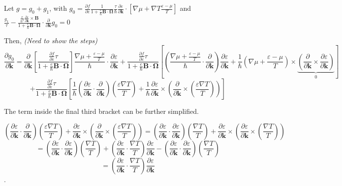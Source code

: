 \documentclass[aps,amsmath,prl]{revtex4-2}
\newcommand{\bvec}[1]{{\mathbf #1}}
\begin{document}
Let $g = g_0 + g_1$, with $g_0 = \frac{\partial f}{\partial \varepsilon}\frac{1}{1 + \frac{e}{\hbar} \bvec{B}\cdot\bvec{\Omega}}
\frac{\tau}{\hbar} \frac{\partial \varepsilon}{\partial \bvec{k}}\cdot\left[ \nabla{\mu} + \nabla T \frac{\varepsilon - \mu}{T}\right]$ and $\frac{g_1}{\tau} -\frac{\frac{e}{\hbar^2} \frac{\partial \varepsilon}{\partial \bvec{k}} \times \bvec{B}}{1 + \frac{e}{\hbar} \bvec{B}\cdot\bvec{\Omega}} \cdot\frac{\partial}{\partial \bvec{k}} g_0 = 0$

Then, \textit{(Need to show the steps)}
$$\frac{\partial g_0}{\partial \bvec{k}} = 
\frac{\partial}{\partial \bvec{k}} \left[ \frac{\frac{\partial f} {\partial \varepsilon} \tau}{1 + \frac{e}{\hbar} \bvec{B}\cdot\bvec{\Omega}}
\right] \frac{\nabla \mu + \frac{\varepsilon - \mu}{T}}{\hbar} \cdot \frac{\partial \varepsilon}{\partial \bvec{k}} + \frac{\frac{\partial f} {\partial \varepsilon} \tau}{1 + \frac{e}{\hbar} \bvec{B}\cdot\bvec{\Omega}} \left[(\frac{\nabla \mu + \frac{\varepsilon - \mu}{T}}{\hbar} \cdot \frac{\partial }{\partial \bvec{k}} )\frac{\partial \varepsilon}{\partial \bvec{k}} + \frac{1}{\hbar} (\nabla \mu + \frac{\varepsilon - \mu}{T})\times \underbrace{(\frac{\partial }{\partial \bvec{k}} \times \frac{\partial \varepsilon}{\partial \bvec{k}})}_0 \right]
$$
$$+ \frac{\frac{\partial f} {\partial \varepsilon} \tau}{1 + \frac{e}{\hbar} \bvec{B}\cdot\bvec{\Omega}} \left[\frac{1}{\hbar} (\frac{\partial \varepsilon}{\partial \bvec{k}} \cdot \frac{\partial }{\partial \bvec{k}}) (\frac{\varepsilon \nabla T}{T}) + \frac{1}{\hbar} \frac{\partial \varepsilon}{\partial \bvec{k}} \times \left(  \frac{\partial }{\partial \bvec{k}} \times \left(\frac{\varepsilon \nabla T}{T}\right) \right) \right]$$

The term inside the final third bracket can be further simplified.

$$ (\frac{\partial \varepsilon}{\partial \bvec{k}} \cdot \frac{\partial }{\partial \bvec{k}}) (\frac{\varepsilon \nabla T}{T}) + \frac{\partial \varepsilon}{\partial \bvec{k}} \times \left(  \frac{\partial }{\partial \bvec{k}} \times \left(\frac{\varepsilon \nabla T}{T}\right) \right) = (\frac{\partial \varepsilon}{\partial \bvec{k}} \cdot \frac{\partial \varepsilon}{\partial \bvec{k}}) (\frac{ \nabla T}{T}) + \frac{\partial \varepsilon}{\partial \bvec{k}} \times \left(  \frac{\partial \varepsilon}{\partial \bvec{k}} \times \left(\frac{\nabla T}{T}\right) \right)$$
$$  =(\frac{\partial \varepsilon}{\partial \bvec{k}} \cdot \frac{\partial \varepsilon}{\partial \bvec{k}}) (\frac{ \nabla T}{T}) + \left(  \frac{\partial \varepsilon}{\partial \bvec{k}} \cdot \frac{\nabla T}{T}\right) \frac{\partial \varepsilon}{\partial \bvec{k}} -  (\frac{\partial \varepsilon}{\partial \bvec{k}} \cdot \frac{\partial \varepsilon}{\partial \bvec{k}}) (\frac{ \nabla T}{T})$$
$$= \left(  \frac{\partial \varepsilon}{\partial \bvec{k}} \cdot \frac{\nabla T}{T}\right) \frac{\partial \varepsilon}{\partial \bvec{k}}$$.
\end{document}
